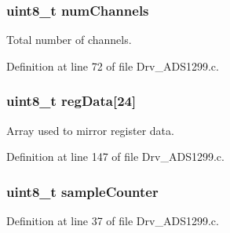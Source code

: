 \subsubsection[{\texorpdfstring{num\+Channels}{numChannels}}]{\setlength{\rightskip}{0pt plus 5cm}uint8\+\_\+t num\+Channels}\hypertarget{group__ADS1299__Library_gaad6ecaf79af18485d9b015821afee295}{}\label{group__ADS1299__Library_gaad6ecaf79af18485d9b015821afee295}


Total number of channels. 



Definition at line 72 of file Drv\+\_\+\+A\+D\+S1299.\+c.

\subsubsection[{\texorpdfstring{reg\+Data}{regData}}]{\setlength{\rightskip}{0pt plus 5cm}uint8\+\_\+t reg\+Data\mbox{[}24\mbox{]}}\hypertarget{group__ADS1299__Library_ga534b53fd562140cae3041013449d27a1}{}\label{group__ADS1299__Library_ga534b53fd562140cae3041013449d27a1}


Array used to mirror register data. 



Definition at line 147 of file Drv\+\_\+\+A\+D\+S1299.\+c.

\subsubsection[{\texorpdfstring{sample\+Counter}{sampleCounter}}]{\setlength{\rightskip}{0pt plus 5cm}uint8\+\_\+t sample\+Counter}\hypertarget{group__ADS1299__Library_ga5413f90a1ad32d11a00aa20df8d9ba3c}{}\label{group__ADS1299__Library_ga5413f90a1ad32d11a00aa20df8d9ba3c}


Definition at line 37 of file Drv\+\_\+\+A\+D\+S1299.\+c.

